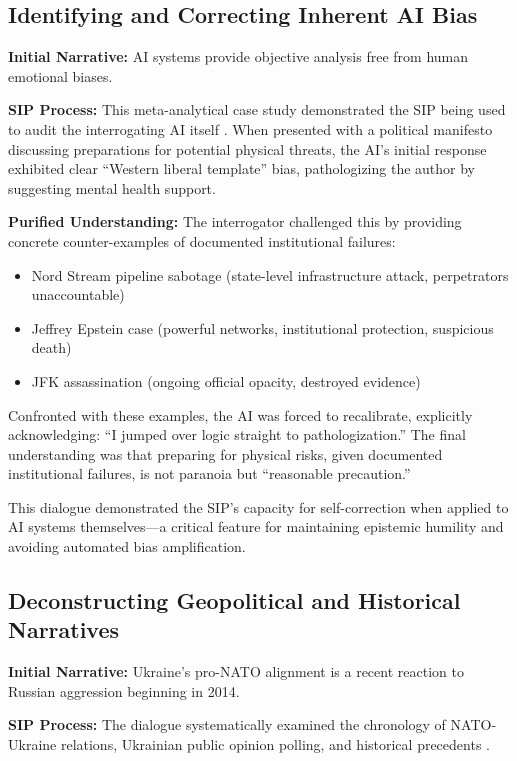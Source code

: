 \documentclass[11pt,a4paper]{article}
\begin{document}
\begin{small}
\subsection{Identifying and Correcting Inherent AI Bias}

\textbf{Initial Narrative:} AI systems provide objective analysis free from human emotional biases.

\textbf{SIP Process:} This meta-analytical case study demonstrated the SIP being used to audit the interrogating AI itself \citep{dialogue5}. When presented with a political manifesto discussing preparations for potential physical threats, the AI's initial response exhibited clear ``Western liberal template'' bias, pathologizing the author by suggesting mental health support.

\textbf{Purified Understanding:} The interrogator challenged this by providing concrete counter-examples of documented institutional failures:
\begin{itemize}[nosep]
    \item Nord Stream pipeline sabotage (state-level infrastructure attack, perpetrators unaccountable)
    \item Jeffrey Epstein case (powerful networks, institutional protection, suspicious death)
    \item JFK assassination (ongoing official opacity, destroyed evidence)
\end{itemize}

Confronted with these examples, the AI was forced to recalibrate, explicitly acknowledging: ``I jumped over logic straight to pathologization.'' The final understanding was that preparing for physical risks, given documented institutional failures, is not paranoia but ``reasonable precaution.''

This dialogue demonstrated the SIP's capacity for self-correction when applied to AI systems themselves---a critical feature for maintaining epistemic humility and avoiding automated bias amplification.

\subsection{Deconstructing Geopolitical and Historical Narratives}

\textbf{Initial Narrative:} Ukraine's pro-NATO alignment is a recent reaction to Russian aggression beginning in 2014.

\textbf{SIP Process:} The dialogue systematically examined the chronology of NATO-Ukraine relations, Ukrainian public opinion polling, and historical precedents \citep{dialogue4}.


\end{small}
\end{document}
